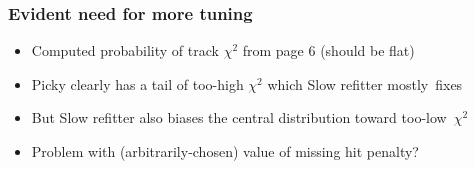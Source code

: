 \documentclass[compress]{beamer}
\begin{document}
\begin{frame}
\frametitle{Evident need for more tuning}

\begin{itemize}
\item Computed probability of track $\chi^2$ from page 6 (should be flat)
\item Picky clearly has a tail of too-high $\chi^2$ which Slow refitter \mbox{mostly fixes\hspace{-1 cm}}
\item But Slow refitter also biases the central distribution toward \mbox{too-low $\chi^2$\hspace{-1 cm}}
\item Problem with (arbitrarily-chosen) value of missing hit penalty?
\end{itemize}


\end{frame}
\end{document}
